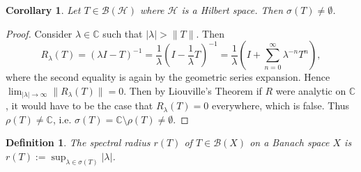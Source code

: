 \documentclass[12pt,oneside]{report}
\newtheorem{cor}[thm]{Corollary}
\newtheorem{defn}[thm]{Definition}
\begin{document}
\begin{cor}\label{spectrum-nonempty}
    Let $T \in \mathscr{B}(\mathscr{H})$ where $\mathscr{H}$ is a Hilbert space. Then $\sigma(T) \neq \emptyset$.
\end{cor}
\begin{proof}
    Consider $\lambda \in \mathbb{C}$ such that $|\lambda| > \|T\|$. Then $$R_{\lambda}(T) = (\lambda I - T)^{-1} = \frac{1}{\lambda}\left( I - \frac{1}{\lambda}T \right)^{-1} = \frac{1}{\lambda}\left( I + \sum_{n=0}^{\infty} \lambda^{-n} T^{n} \right),$$ where the second equality is again by the geometric series expansion. Hence $\lim_{ |\lambda| \to \infty } \|R_{\lambda}(T)\| = 0$. Then by Liouville's Theorem if $R$ were analytic on $\mathbb{C}$, it would have to be the case that $R_{\lambda}(T) = 0$ everywhere, which is false. Thus $\rho(T) \neq \mathbb{C}$, i.e. $\sigma(T) = \mathbb{C} \setminus \rho(T) \neq \emptyset$.
\end{proof}

\begin{defn}
    The spectral radius $r(T)$ of $T \in \mathscr{B}(X)$ on a Banach space $X$ is $r(T) := \sup_{\lambda \in \sigma(T)} |\lambda|$.
\end{defn}
\end{document}
